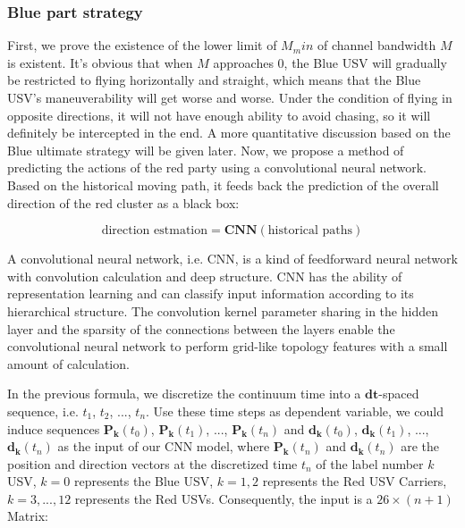 \documentclass{mcmthesis}
\begin{document}
\subsubsection{Blue part strategy}

First, we prove the existence of the lower limit of $M_min$ of channel bandwidth $M$ is existent. It's obvious that when $M$ approaches $0$, the Blue USV will gradually be restricted to flying horizontally and straight, which means that the Blue USV's maneuverability will get worse and worse. Under the condition of flying in opposite directions, it will not have enough ability to avoid chasing, so it will definitely be intercepted in the end. A more quantitative discussion based on the Blue ultimate strategy will be given later. Now, we propose a method of predicting the actions of the red party using a convolutional neural network. Based on the historical moving path, it feeds back the prediction of the overall direction of the red cluster as a black box: \par

\begin{equation}
\mbox{direction estmation} = \mathbf{CNN}({\mbox{historical paths}})
\end{equation}

A convolutional neural network, i.e. CNN, is a kind of feedforward neural network with convolution calculation and deep structure. CNN has the ability of representation learning and can classify input information according to its hierarchical structure. The convolution kernel parameter sharing in the hidden layer and the sparsity of the connections between the layers enable the convolutional neural network to perform grid-like topology features with a small amount of calculation. \par

In the previous formula, we discretize the continuum time into a $\mathbf{dt}$-spaced sequence, i.e. $t_1$, $t_2$, ..., $t_n$.  Use these time steps as dependent variable, we could induce sequences $\mathbf{P_{k}}(t_0)$, $\mathbf{P_{k}}(t_1)$, ..., $\mathbf{P_{k}}(t_n)$ and $\mathbf{d_{k}}(t_0)$, $\mathbf{d_{k}}(t_1)$, ..., $\mathbf{d_{k}}(t_n)$  as the input of our CNN model, where $\mathbf{P_{k}}(t_n)$ and $\mathbf{d_{k}}(t_n)$ are the position and direction vectors at the discretized time $t_n$ of the label number $k$ USV, $k=0$ represents the Blue USV, $k = 1, 2$ represents the Red USV Carriers, $k=3,...,12$ represents the Red USVs. Consequently, the input is a $26 \times (n+1)$ Matrix:
\end{document}
